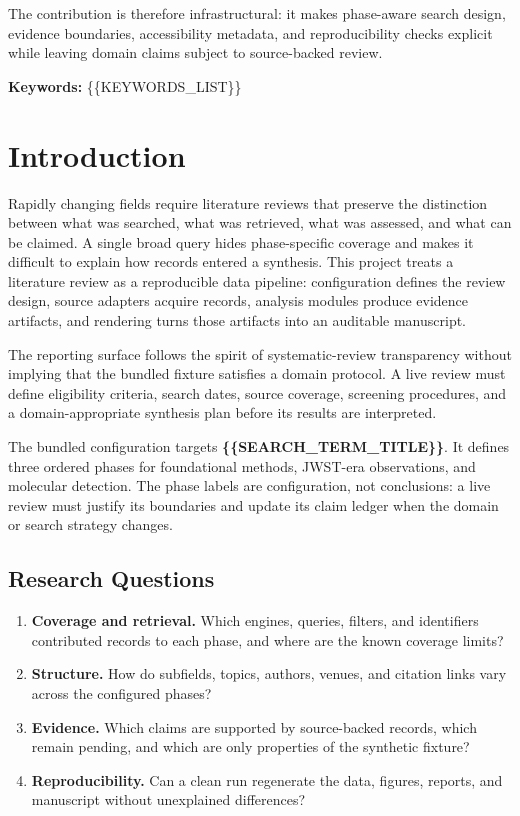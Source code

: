 \documentclass[
]{article}
\providecommand{\tightlist}{%
  \setlength{\itemsep}{0pt}\setlength{\parskip}{0pt}}
\begin{document}
The contribution is therefore infrastructural: it makes phase-aware
search design, evidence boundaries, accessibility metadata, and
reproducibility checks explicit while leaving domain claims subject to
source-backed review.

\textbf{Keywords:} \{\{KEYWORDS\_LIST\}\}

\newpage

\section{Introduction}\label{introduction}

Rapidly changing fields require literature reviews that preserve the
distinction between what was searched, what was retrieved, what was
assessed, and what can be claimed. A single broad query hides
phase-specific coverage and makes it difficult to explain how records
entered a synthesis. This project treats a literature review as a
reproducible data pipeline: configuration defines the review design,
source adapters acquire records, analysis modules produce evidence
artifacts, and rendering turns those artifacts into an auditable
manuscript.

The reporting surface follows the spirit of systematic-review
transparency \citep{page2021prisma} without implying that the bundled
fixture satisfies a domain protocol. A live review must define
eligibility criteria, search dates, source coverage, screening
procedures, and a domain-appropriate synthesis plan before its results
are interpreted.

The bundled configuration targets \textbf{\{\{SEARCH\_TERM\_TITLE\}\}}.
It defines three ordered phases for foundational methods, JWST-era
observations, and molecular detection. The phase labels are
configuration, not conclusions: a live review must justify its
boundaries and update its claim ledger when the domain or search
strategy changes.

\subsection{Research Questions}\label{research-questions}

\begin{enumerate}
\def\labelenumi{\arabic{enumi}.}
\tightlist
\item
  \textbf{Coverage and retrieval.} Which engines, queries, filters, and
  identifiers contributed records to each phase, and where are the known
  coverage limits?
\item
  \textbf{Structure.} How do subfields, topics, authors, venues, and
  citation links vary across the configured phases?
\item
  \textbf{Evidence.} Which claims are supported by source-backed
  records, which remain pending, and which are only properties of the
  synthetic fixture?
\item
  \textbf{Reproducibility.} Can a clean run regenerate the data,
  figures, reports, and manuscript without unexplained differences?
\end{enumerate}
\end{document}
